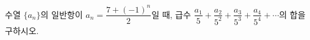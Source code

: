수열 $\{a_n\}$의 일반항이 $a_n=\dfrac{7+(-1)^{n}}{2}$일 때, 급수 $\dfrac{a_1}{5}+\dfrac{a_2}{5^{2}}+\dfrac{a_3}{5^{3}}+\dfrac{a_4}{5^{4}}+\cdots$의 합을 구하시오.
